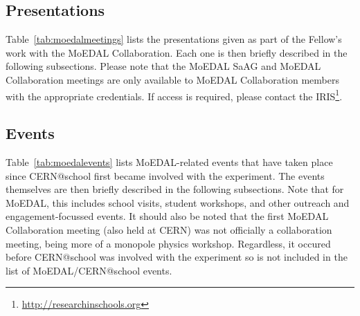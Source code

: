 



\clearpage

\subsection{Presentations}
\label{sec:moedalpres}
Table~\ref{tab:moedalmeetings} lists the presentations given as part
of the Fellow's work with the \acs{MoEDAL} Collaboration.
Each one is then briefly described in the following
subsections.
%
Please note that the \acs{MoEDAL}
\acf{SaAG} %
and \acs{MoEDAL} Collaboration meetings are only available to
\acs{MoEDAL} Collaboration members with the appropriate
credentials.
%
If access is required, please contact the
\acl{IRIS}\footnote{%
\url{http://researchinschools.org}}.



\clearpage



\clearpage

\subsection{Events}
\label{sec:moedalevents}
Table~\ref{tab:moedalevents} lists MoEDAL-related events that
have taken place since CERN@school first became involved with the
experiment.
The events themselves are then briefly described in the following subsections.
Note that for MoEDAL, this includes school visits, student workshops,
and other outreach and engagement-focussed events.
%
It should also be noted that the first MoEDAL Collaboration meeting
(also held at CERN) was not officially a collaboration meeting,
being more of a monopole physics workshop.  Regardless, it occured
before CERN@school was involved with the experiment so is not included
in the list of MoEDAL/CERN@school events.



\clearpage



